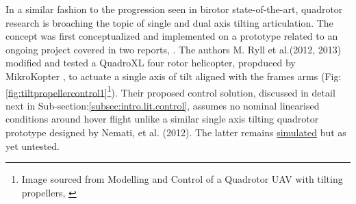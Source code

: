 \par
In a similar fashion to the progression seen in birotor state-of-the-art, quadrotor research is broaching the topic of single and dual axis tilting articulation. The concept was first conceptualized and implemented on a prototype related to an ongoing project covered in two reports, \cite{tiltpropellercontrol,tiltpropellerflight}. The authors M. Ryll et al.(2012, 2013) modified and tested a QuadroXL four rotor helicopter, propduced by MikroKopter \cite{mikrokopter}, to actuate a single axis of tilt aligned with the frames arms (Fig:\ref{fig:tiltpropellercontrol1}\footnote{Image sourced from Modelling and Control of a Quadrotor UAV with tilting propellers, \cite{tiltpropellercontrol}}). Their proposed control solution, discussed in detail next in Sub-section:\ref{subsec:intro.lit.control}, assumes no nominal linearised conditions around hover flight unlike a similar single axis tilting quadrotor prototype designed by Nemati, et al. (2012)\cite{singleaxistilting}. The latter remains  \underline{simulated} but as yet untested.
